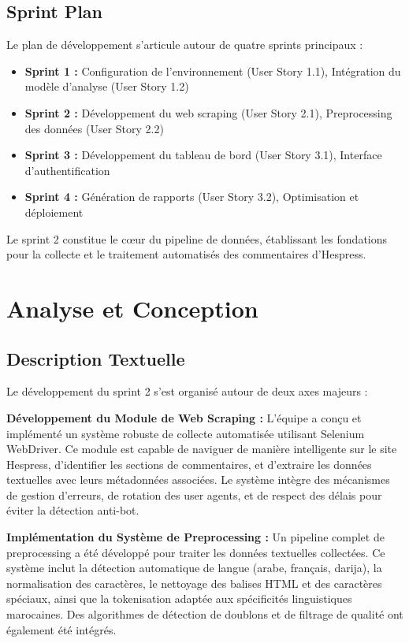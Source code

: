 \subsection{Sprint Plan}

Le plan de développement s'articule autour de quatre sprints principaux :

\begin{itemize}
    \item \textbf{Sprint 1 :} Configuration de l'environnement (User Story 1.1), Intégration du modèle d'analyse (User Story 1.2)
    \item \textbf{Sprint 2 :} Développement du web scraping (User Story 2.1), Preprocessing des données (User Story 2.2)
    \item \textbf{Sprint 3 :} Développement du tableau de bord (User Story 3.1), Interface d'authentification
    \item \textbf{Sprint 4 :} Génération de rapports (User Story 3.2), Optimisation et déploiement
\end{itemize}

Le sprint 2 constitue le cœur du pipeline de données, établissant les fondations pour la collecte et le traitement automatisés des commentaires d'Hespress.

\section{Analyse et Conception}

\subsection{Description Textuelle}

Le développement du sprint 2 s'est organisé autour de deux axes majeurs :

\textbf{Développement du Module de Web Scraping :} L'équipe a conçu et implémenté un système robuste de collecte automatisée utilisant Selenium WebDriver. Ce module est capable de naviguer de manière intelligente sur le site Hespress, d'identifier les sections de commentaires, et d'extraire les données textuelles avec leurs métadonnées associées. Le système intègre des mécanismes de gestion d'erreurs, de rotation des user agents, et de respect des délais pour éviter la détection anti-bot.

\textbf{Implémentation du Système de Preprocessing :} Un pipeline complet de preprocessing a été développé pour traiter les données textuelles collectées. Ce système inclut la détection automatique de langue (arabe, français, darija), la normalisation des caractères, le nettoyage des balises HTML et des caractères spéciaux, ainsi que la tokenisation adaptée aux spécificités linguistiques marocaines. Des algorithmes de détection de doublons et de filtrage de qualité ont également été intégrés.

